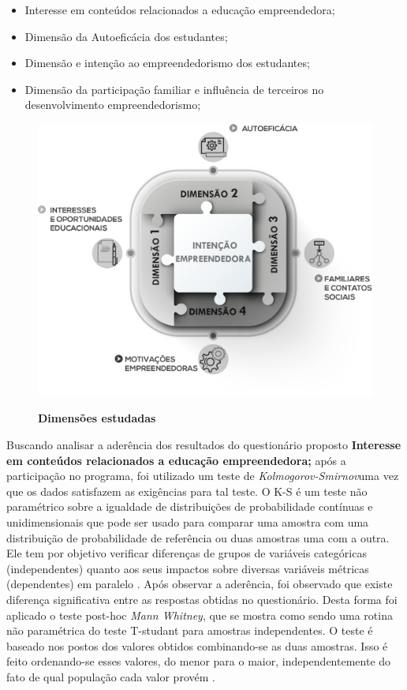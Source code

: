 \begin{itemize}
\item {Interesse em conteúdos relacionados a educação empreendedora;}
\item {Dimensão da Autoeficácia dos estudantes;}
\item {Dimensão e intenção  ao empreendedorismo dos estudantes;}
\item {Dimensão da participação familiar e influência de terceiros no desenvolvimento empreendedorismo;}
\end{itemize}



\begin{figure}[H]
\centering
\caption{\textbf{Dimensões estudadas}}
\includegraphics[scale=0.3]{Imagens/dimencoes.png}
\label{figura_9}
\end{figure}








Buscando analisar a aderência dos resultados do questionário proposto \textbf{Interesse em conteúdos relacionados a educação empreendedora;} após a participação no programa, foi utilizado um teste de \textit{Kolmogorov-Smirnov}uma vez que os dados satisfazem as exigências para tal teste. O K-S é um teste não paramétrico sobre a igualdade de distribuições de probabilidade contínuas e unidimensionais que pode ser usado para comparar uma amostra com uma distribuição de probabilidade de referência ou duas amostras uma com a outra. Ele tem por objetivo verificar diferenças de grupos de variáveis categóricas (independentes) quanto aos seus impactos sobre diversas variáveis métricas (dependentes) em paralelo \cite{hair_alise_2009}. Após observar a aderência, foi observado que existe diferença significativa entre as respostas obtidas no questionário. Desta forma foi aplicado o teste post-hoc \textit{Mann Whitney}, que se mostra como sendo uma rotina não paramétrica do teste T-studant para amostras independentes. O teste  é baseado nos postos dos valores obtidos combinando-se as duas amostras. Isso é feito ordenando-se esses valores, do menor para o maior, independentemente do fato de qual população cada valor provém \cite{matsouaka_optimal_2018}.

